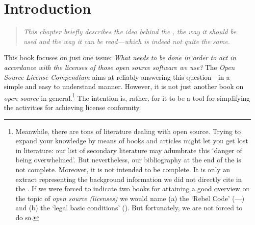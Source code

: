 %
%
%
%
%




\chapter{Introduction}

\footnotesize \begin{quote}\itshape
This chapter briefly describes the idea behind the \oslic, the way it should be
used and the way it can be read---which is indeed not quite the same.
\end{quote}
\normalsize{}

This book focuses on just one issue: \emph{What needs to be done in order to act
in accordance with the licenses of those \emph{open source software} we use?}
The \emph{Open Source License Compendium} aims at reliably answering this
question---in a simple and easy to understand manner. However, it is not just
another book on \emph{open source} in ge\-ne\-ral.\footnote{Meanwhile, there are
tons of literature dealing with open source. Trying to expand your knowledge by
means of books and articles might let you get lost in literature: our list of
secondary literature may adumbrate this `danger of being overwhelmed'. But
nevertheless, our bibliography at the end of the \oslic{} is not complete.
Moreover, it is not intended to be complete. It is only an extract representing
the background information we did not directly cite in the \oslic. If we were
forced to indicate two books for attaining a good overview on the topic of
\emph{open source (licenses)} we would name (a) the `Rebel Code' (\cite[for a
German version cf.][\nopage passim]{Moody2001a}---\cite[for an English version
cf.][passim]{Moody2002a}) and (b) the `legal basic conditions'
(\cite[cf.][\nopage passim]{JaeMet2011a}). But fortunately, we are not forced to
do so.} The intention is, rather, for it to be a tool for simplifying the
activities for achieving license conformity.



